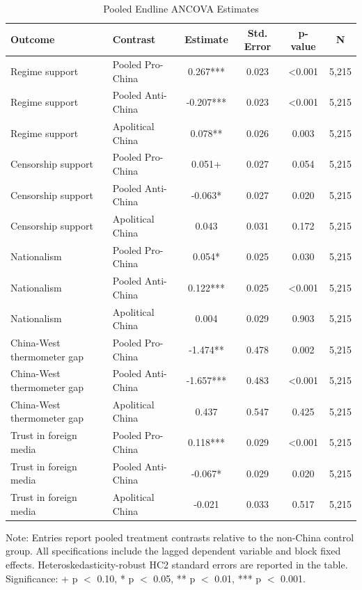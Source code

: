 \begin{table}[H]
\centering
\caption{Pooled Endline ANCOVA Estimates}
\label{tab:pooled_effects_t1}
\footnotesize
\begin{threeparttable}
\begin{tabular}{llcccc}
\toprule
Outcome & Contrast & Estimate & Std. Error & p-value & N \\
\midrule
Regime support & Pooled Pro-China & 0.267*** & 0.023 & <0.001 & 5,215 \\
Regime support & Pooled Anti-China & -0.207*** & 0.023 & <0.001 & 5,215 \\
Regime support & Apolitical China & 0.078** & 0.026 & 0.003 & 5,215 \\
Censorship support & Pooled Pro-China & 0.051+ & 0.027 & 0.054 & 5,215 \\
Censorship support & Pooled Anti-China & -0.063* & 0.027 & 0.020 & 5,215 \\
Censorship support & Apolitical China & 0.043 & 0.031 & 0.172 & 5,215 \\
Nationalism & Pooled Pro-China & 0.054* & 0.025 & 0.030 & 5,215 \\
Nationalism & Pooled Anti-China & 0.122*** & 0.025 & <0.001 & 5,215 \\
Nationalism & Apolitical China & 0.004 & 0.029 & 0.903 & 5,215 \\
China-West thermometer gap & Pooled Pro-China & -1.474** & 0.478 & 0.002 & 5,215 \\
China-West thermometer gap & Pooled Anti-China & -1.657*** & 0.483 & <0.001 & 5,215 \\
China-West thermometer gap & Apolitical China & 0.437 & 0.547 & 0.425 & 5,215 \\
Trust in foreign media & Pooled Pro-China & 0.118*** & 0.029 & <0.001 & 5,215 \\
Trust in foreign media & Pooled Anti-China & -0.067* & 0.029 & 0.020 & 5,215 \\
Trust in foreign media & Apolitical China & -0.021 & 0.033 & 0.517 & 5,215 \\
\bottomrule
\end{tabular}
\begin{tablenotes}[flushleft]
\footnotesize
\item Note: Entries report pooled treatment contrasts relative to the non-China control group. All specifications include the lagged dependent variable and block fixed effects. Heteroskedasticity-robust HC2 standard errors are reported in the table. Significance: + p $<$ 0.10, * p $<$ 0.05, ** p $<$ 0.01, *** p $<$ 0.001.
\end{tablenotes}
\end{threeparttable}
\end{table}
